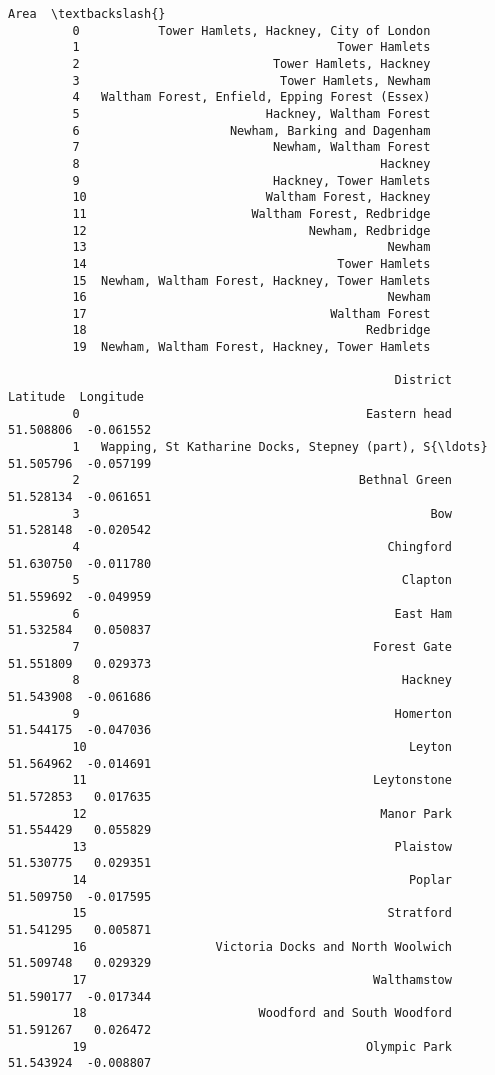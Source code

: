 \documentclass[11pt]{article}
\begin{document}
\begin{Verbatim}[commandchars=\\\{\}]
                                                       Area  \textbackslash{}
         0           Tower Hamlets, Hackney, City of London   
         1                                    Tower Hamlets   
         2                           Tower Hamlets, Hackney   
         3                            Tower Hamlets, Newham   
         4   Waltham Forest, Enfield, Epping Forest (Essex)   
         5                          Hackney, Waltham Forest   
         6                     Newham, Barking and Dagenham   
         7                           Newham, Waltham Forest   
         8                                          Hackney   
         9                           Hackney, Tower Hamlets   
         10                         Waltham Forest, Hackney   
         11                       Waltham Forest, Redbridge   
         12                               Newham, Redbridge   
         13                                          Newham   
         14                                   Tower Hamlets   
         15  Newham, Waltham Forest, Hackney, Tower Hamlets   
         16                                          Newham   
         17                                  Waltham Forest   
         18                                       Redbridge   
         19  Newham, Waltham Forest, Hackney, Tower Hamlets   
         
                                                      District   Latitude  Longitude  
         0                                        Eastern head  51.508806  -0.061552  
         1   Wapping, St Katharine Docks, Stepney (part), S{\ldots}  51.505796  -0.057199  
         2                                       Bethnal Green  51.528134  -0.061651  
         3                                                 Bow  51.528148  -0.020542  
         4                                           Chingford  51.630750  -0.011780  
         5                                             Clapton  51.559692  -0.049959  
         6                                            East Ham  51.532584   0.050837  
         7                                         Forest Gate  51.551809   0.029373  
         8                                             Hackney  51.543908  -0.061686  
         9                                            Homerton  51.544175  -0.047036  
         10                                             Leyton  51.564962  -0.014691  
         11                                        Leytonstone  51.572853   0.017635  
         12                                         Manor Park  51.554429   0.055829  
         13                                           Plaistow  51.530775   0.029351  
         14                                             Poplar  51.509750  -0.017595  
         15                                          Stratford  51.541295   0.005871  
         16                  Victoria Docks and North Woolwich  51.509748   0.029329  
         17                                        Walthamstow  51.590177  -0.017344  
         18                        Woodford and South Woodford  51.591267   0.026472  
         19                                       Olympic Park  51.543924  -0.008807  
\end{Verbatim}
            
\end{document}

